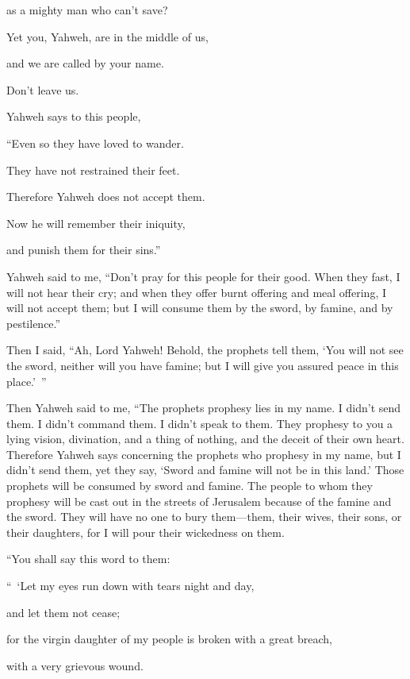 {\par }{\QB as a mighty man who can’t save?
\par }{\Q Yet you, Yahweh, are in the middle of us,
\par }{\QB and we are called by your name.
\par }{\QB Don’t leave us.
\par }{\PP {}Yahweh says to this people,
\par }{\Q “Even so they have loved to wander.
\par }{\QB They have not restrained their feet.
\par }{\Q Therefore Yahweh does not accept them.
\par }{\QB Now he will remember their iniquity,
\par }{\QB and punish them for their sins.”
\par }{\PP {}Yahweh said to me, “Don’t pray for this people for their good.
When they fast, I will not hear their cry; and when they offer burnt offering and meal offering, I will not accept them; but I will consume them by the sword, by famine, and by pestilence.”
\par }{\PP {}Then I said, “Ah, Lord Yahweh! Behold, the prophets tell them, ‘You will not see the sword, neither will you have famine; but I will give you assured peace in this place.’ ”
\par }{\PP {}Then Yahweh said to me, “The prophets prophesy lies in my name. I didn’t send them. I didn’t command them. I didn’t speak to them. They prophesy to you a lying vision, divination, and a thing of nothing, and the deceit of their own heart.
Therefore Yahweh says concerning the prophets who prophesy in my name, but I didn’t send them, yet they say, ‘Sword and famine will not be in this land.’ Those prophets will be consumed by sword and famine.
The people to whom they prophesy will be cast out in the streets of Jerusalem because of the famine and the sword. They will have no one to bury them—them, their wives, their sons, or their daughters, for I will pour their wickedness on them.
\par }{\PP {}“You shall say this word to them:
\par }{\Q “ ‘Let my eyes run down with tears night and day,
\par }{\QB and let them not cease;
\par }{\Q for the virgin daughter of my people is broken with a great breach,
\par }{\QB with a very grievous wound.
}
